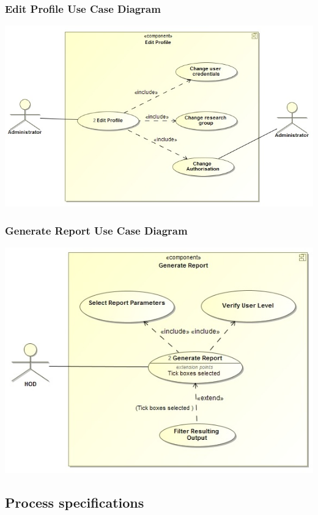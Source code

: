 \documentclass[a4paper,12pt]{article}
\begin{document}
	\subsubsection{Edit Profile Use Case Diagram}
	\includegraphics[width=1\textwidth]{./EditProfile.jpg}\\[1.5cm]
	
	\subsubsection{Generate Report Use Case Diagram}
	\includegraphics[width=1\textwidth]{./GenerateReport.jpg}\\[1.5cm]
		
\subsection{Process specifications}
\end{document}

